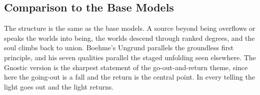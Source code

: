 \subsection{Comparison to the Base Models}

The structure is the same as the base models. A source beyond being overflows or
speaks the worlds into being, the worlds descend through ranked degrees, and
the soul climbs back to union. Boehme's Ungrund parallels the groundless first
principle, and his seven qualities parallel the staged unfolding seen elsewhere.
The Gnostic version is the sharpest statement of the go-out-and-return theme,
since here the going-out is a fall and the return is the central point. In every
telling the light goes out and the light returns.

